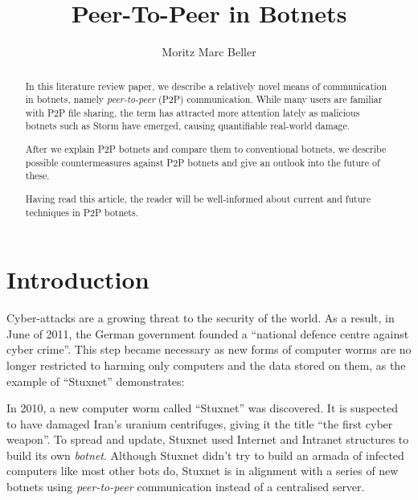 \documentclass{llncs}
\title{Peer-To-Peer in Botnets}
\author{Moritz Marc Beller}
\institute{%
   Fakultät für Informatik, \\
   Technische Universität München \\
   \email{\{beller\}@in.tum.de}
}
\begin{document}
\maketitle

\begin{abstract}
In this literature review paper, we describe a relatively novel means
of communication in botnets, namely {\it peer-to-peer} (P2P)
communication.  While many users are familiar with P2P file sharing,
the term has attracted more attention lately as malicious botnets such
as Storm\cite{davis2008sybil} have emerged, causing quantifiable
real-world damage.

After we explain P2P botnets and compare them to conventional botnets,
we describe possible countermeasures against P2P botnets and give an
outlook into the future of these.

Having read this article, the reader will be well-informed about
current and future techniques in P2P botnets.
\end{abstract}

\section{Introduction}

Cyber-attacks are a growing threat to the security of the world. As a
result, in June of 2011, the German government founded a ``national
defence centre against cyber crime''.\cite{cyber} This step became
necessary as new forms of computer worms are no longer restricted to
harming only computers and the data stored on them, as the example of
``Stuxnet'' demonstrates:

 In 2010, a new computer worm called ``Stuxnet'' was discovered. It is
 suspected to have damaged Iran's uranium centrifuges, giving it the
 title ``the first cyber weapon''\cite{benzin2011first}. To spread and
 update, Stuxnet used Internet and Intranet structures to build its
 own {\it botnet}.\cite{fallierew32} Although Stuxnet didn't try to
 build an armada of infected computers like most other bots do,
 Stuxnet is in alignment with a series of new botnets using {\it
   peer-to-peer} communication instead of a centralised server.
\end{document}
